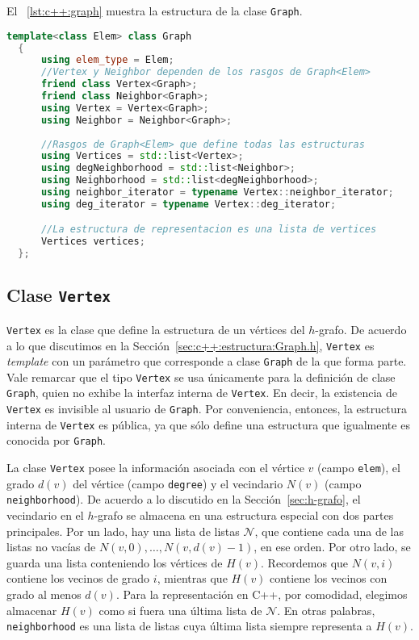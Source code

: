 \documentclass[%
    a4paper,%
    fontsize=12pt,%
    DIV=12,
    twoside,%
    openright,%
    titlepage=true,%
    headsepline,%
    toc=bibliography,%
    parskip=half,%
    cleardoublepage=empty,%
    headings=big,%
]{scrbook}
\makeatletter
\newcommand{\Code}[2][]{\lstinline[basicstyle={\ttfamily},#1]@#2@}
\newcommand{\CPPCode}[2][]{\lstinline[language=C++,basicstyle={\ttfamily},#1]@#2@}
\newcommand{\N}{\mathcal{N}}
\newcommand{\Graph}{\CPPCode{Graph}\xspace}
\DeclareRobustCommand{\CPP}{C\nolinebreak[4]\hspace{-.05em}\raisebox{.4ex}{\relsize{-3}\textbf{++}}\xspace}
\def\CPP{C++}%
\makeatother
\begin{document}
El \lstlistingname~\ref{lst:c++:graph} muestra la estructura de la clase \Graph.

\begin{lstlisting}[language={C++},caption={Estructura del tipo Grafo en C++.},gobble=2,float=ht,label={lst:c++:graph}]
  template<class Elem> class Graph
  {
      using elem_type = Elem;
      //Vertex y Neighbor dependen de los rasgos de Graph<Elem>
      friend class Vertex<Graph>;
      friend class Neighbor<Graph>;
      using Vertex = Vertex<Graph>; 
      using Neighbor = Neighbor<Graph>;
      
      //Rasgos de Graph<Elem> que define todas las estructuras
      using Vertices = std::list<Vertex>;
      using degNeighborhood = std::list<Neighbor>;
      using Neighborhood = std::list<degNeighborhood>;
      using neighbor_iterator = typename Vertex::neighbor_iterator;
      using deg_iterator = typename Vertex::deg_iterator;

      //La estructura de representacion es una lista de vertices
      Vertices vertices;
  };
\end{lstlisting}

\subsection{Clase \texorpdfstring{\protect\CPPCode{Vertex}}{Vertex}}
\label{sec:c++:estructura:Vertex.h}

\CPPCode{Vertex} es la clase que define la estructura de un vértices del $h$-grafo.  De acuerdo a lo que discutimos en la Sección~\ref{sec:c++:estructura:Graph.h}, \CPPCode{Vertex} es \emph{template} con un parámetro que corresponde a clase \CPPCode{Graph} de la que forma parte.  Vale remarcar que el tipo \CPPCode{Vertex} se usa únicamente para la definición de clase \Code{Graph}, quien no exhibe la interfaz interna de \CPPCode{Vertex}.  En decir, la existencia de \CPPCode{Vertex} es invisible al usuario de \CPPCode{Graph}.  Por conveniencia, entonces, la estructura interna de \CPPCode{Vertex} es pública, ya que sólo define una estructura que igualmente es conocida por \Code{Graph}.

La clase \CPPCode{Vertex} posee la información asociada con el vértice $v$ (campo \CPPCode{elem}), el grado $d(v)$ del vértice (campo \CPPCode{degree}) y el vecindario $N(v)$ (campo \CPPCode{neighborhood}).  De acuerdo a lo discutido en la Sección~\ref{sec:h-grafo}, el vecindario en el $h$-grafo se almacena en una estructura especial con dos partes principales.  Por un lado, hay una lista de listas $\N$, que contiene cada una de las listas no vacías de $N(v, 0), \ldots, N(v, d(v)-1)$, en ese orden.  Por otro lado, se guarda una lista conteniendo los vértices de $H(v)$.  Recordemos que $N(v, i)$ contiene los vecinos de grado $i$, mientras que $H(v)$ contiene los vecinos con grado al menos $d(v)$.  Para la representación en \CPP, por comodidad, elegimos almacenar $H(v)$ como si fuera una última lista de $\N$.  En otras palabras, \CPPCode{neighborhood} es una lista de listas cuya última lista siempre representa a $H(v)$.
\end{document}
